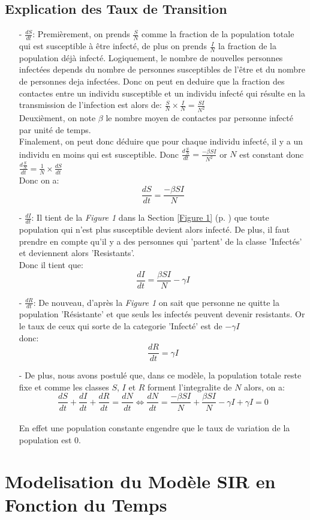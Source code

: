 \documentclass[a4paper,12pt]{scrartcl}
\begin{document}
\subsection{Explication des Taux de Transition}
\begin{itemize}
    \item[-] $\frac{dS}{dt}$: Premièrement, on prends $\frac{S}{N}$ comme la fraction de la population totale qui est 
        susceptible à être infecté, de plus on prends $\frac{I}{N}$ la fraction de la population déjà infecté. 
        Logiquement, le nombre de nouvelles personnes infectées depends du nombre de personnes susceptibles de l'être
        et du nombre de personnes deja infectées. Donc on peut en deduire que la fraction des contactes entre un individu 
        susceptible et un individu infecté qui résulte en la transmission de l'infection est alors de: 
        $\frac{S}{N} \times  \frac{I}{N} = \frac{SI}{N^2}$ \\
        Deuxièment, on note $\beta$ le nombre moyen de contactes par personne infecté par unité de temps.\\
        Finalement, on peut donc déduire que pour chaque individu infecté, il y a un individu en moins qui est
        susceptible. Donc $\frac{d\frac{S}{N}}{dt} = \frac{-\beta SI}{N^2}$ or $N$ est constant donc $\frac{d\frac{S}{N}}{dt}=\frac{1}{N}\times \frac{dS}{dt}$ 
        \\ Donc on a: \[ \boxed{\frac{dS}{dt} = \frac{-\beta SI}{N}}\]
    \item[-] $\frac{dI}{dt}$: Il tient de la \emph{Figure 1} dans la Section \ref{Figure 1} (p. \pageref{Figure 1}) que toute 
        population qui n'est plus susceptible devient alors infecté. De plus, il faut prendre en compte qu'il y a des personnes qui 
        'partent' de la classe 'Infectés' et deviennent alors 'Resistants'. 
        \\ Donc il tient que: \[ \boxed{ \frac{dI}{dt} = \frac{\beta SI}{N}-\gamma I}\] 
    \item[-] $\frac{dR}{dt}$: De nouveau, d'après la \emph{Figure 1} on sait que personne ne quitte la population 
        'Résistante' et que seuls les infectés peuvent devenir resistants. Or le taux de ceux qui sorte de la categorie 
        'Infecté' est de $- \gamma I$ \\ donc: \[ \boxed{\frac{dR}{dt} = \gamma I} \]
    \item[-] De plus, nous avons postulé que, dans ce modèle, la population totale reste fixe et comme les classes $S$, $I$ et $R$ forment
        l'integralite de $N$ alors, on a: \\
        \[\frac{dS}{dt}+\frac{dI}{dt}+\frac{dR}{dt} = \frac{dN}{dt} \Leftrightarrow \frac{dN}{dt}=\frac{-\beta SI}{N} + \frac{\beta SI}{N}-\gamma I + \gamma I = 0\] 
        \\ En effet une population constante engendre que le taux de variation de la population est 0. 
\end{itemize}


\section{Modelisation du Modèle SIR en Fonction du Temps}
\end{document}
